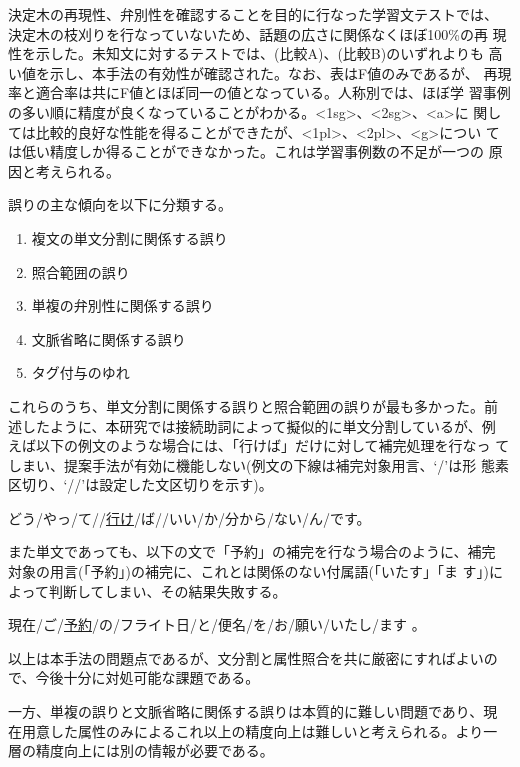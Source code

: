 決定木の再現性、弁別性を確認することを目的に行なった学習文テストでは、
決定木の枝刈りを行なっていないため、話題の広さに関係なくほぼ100\%の再
現性を示した。未知文に対するテストでは、(比較A)、(比較B)のいずれよりも
高い値を示し、本手法の有効性が確認された。なお、表はF値のみであるが、
再現率と適合率は共にF値とほぼ同一の値となっている。人称別では、ほぼ学
習事例の多い順に精度が良くなっていることがわかる。<1sg>、<2sg>、<a>に
関しては比較的良好な性能を得ることができたが、<1pl>、<2pl>、<g>につい
ては低い精度しか得ることができなかった。これは学習事例数の不足が一つの
原因と考えられる。

誤りの主な傾向を以下に分類する。

\begin{enumerate}
\item 複文の単文分割に関係する誤り
\item 照合範囲の誤り
\item 単複の弁別性に関係する誤り
\item 文脈省略に関係する誤り
\item タグ付与のゆれ
\end{enumerate}

これらのうち、単文分割に関係する誤りと照合範囲の誤りが最も多かった。前
述したように、本研究では接続助詞によって擬似的に単文分割しているが、例
えば以下の例文のような場合には、「行けば」だけに対して補完処理を行なっ
てしまい、提案手法が有効に機能しない(例文の下線は補完対象用言、`/'は形
態素区切り、`//'は設定した文区切りを示す)。

\begin{example}
\item どう/やっ/て//\underline{行け}/ば//いい/か/分から/ない/ん/です。
\end{example}

また単文であっても、以下の文で「予約」の補完を行なう場合のように、補完
対象の用言(「予約」)の補完に、これとは関係のない付属語(「いたす」「ま
す」)によって判断してしまい、その結果失敗する。

\begin{example}
\item 現在/ご/\underline{予約}/の/フライト日/と/便名/を/お/願い/いたし/ます 。
\end{example}

以上は本手法の問題点であるが、文分割と属性照合を共に厳密にすればよいの
で、今後十分に対処可能な課題である。

一方、単複の誤りと文脈省略に関係する誤りは本質的に難しい問題であり、現
在用意した属性のみによるこれ以上の精度向上は難しいと考えられる。より一
層の精度向上には別の情報が必要である。


